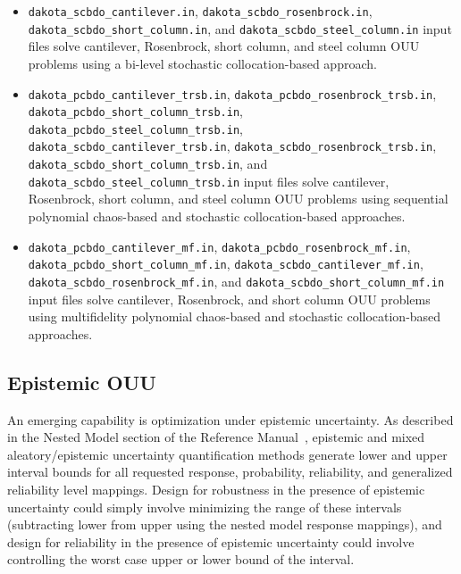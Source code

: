 \begin{itemize}
\item \texttt{dakota\_scbdo\_cantilever.in}, 
\texttt{dakota\_scbdo\_rosenbrock.in}, \\
\texttt{dakota\_scbdo\_short\_column.in}, and
\texttt{dakota\_scbdo\_steel\_column.in} input files solve 
cantilever, Rosenbrock, short column, and steel column OUU problems
using a bi-level stochastic collocation-based approach.

\item \texttt{dakota\_pcbdo\_cantilever\_trsb.in},
\texttt{dakota\_pcbdo\_rosenbrock\_trsb.in}, \\
\texttt{dakota\_pcbdo\_short\_column\_trsb.in}, 
\texttt{dakota\_pcbdo\_steel\_column\_trsb.in},\\
\texttt{dakota\_scbdo\_cantilever\_trsb.in}, 
\texttt{dakota\_scbdo\_rosenbrock\_trsb.in}, \\
\texttt{dakota\_scbdo\_short\_column\_trsb.in}, and
\texttt{dakota\_scbdo\_steel\_column\_trsb.in} input files solve 
cantilever, Rosenbrock, short column, and steel column OUU problems
using sequential polynomial chaos-based and stochastic
collocation-based approaches.

\item \texttt{dakota\_pcbdo\_cantilever\_mf.in},
\texttt{dakota\_pcbdo\_rosenbrock\_mf.in}, \\
\texttt{dakota\_pcbdo\_short\_column\_mf.in}, 
\texttt{dakota\_scbdo\_cantilever\_mf.in}, \\
\texttt{dakota\_scbdo\_rosenbrock\_mf.in}, and
\texttt{dakota\_scbdo\_short\_column\_mf.in} input files solve 
cantilever, Rosenbrock, and short column OUU problems
using multifidelity polynomial chaos-based and stochastic
collocation-based approaches.
\end{itemize}


\subsection{Epistemic OUU} \label{adv_models:ouu:epistemic}

An emerging capability is optimization under epistemic uncertainty.
As described in the Nested Model section of the Reference
Manual~\cite{RefMan}, epistemic and mixed aleatory/epistemic
uncertainty quantification methods generate lower and upper interval
bounds for all requested response, probability, reliability, and
generalized reliability level mappings. Design for robustness in the
presence of epistemic uncertainty could simply involve minimizing the
range of these intervals (subtracting lower from upper using the
nested model response mappings), and design for reliability in the
presence of epistemic uncertainty could involve controlling the worst
case upper or lower bound of the interval.

